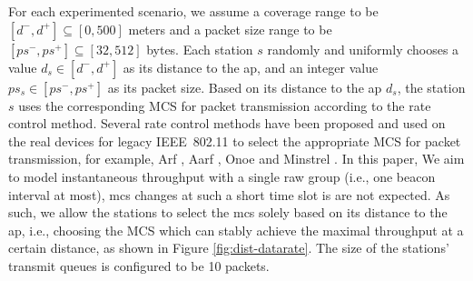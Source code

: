 For each experimented scenario, we assume a coverage range to be $[d^-, d^+]  \subseteq [0, 500] $  meters and a packet size range to be $[ps^-, ps^+] \subseteq [32, 512] $ bytes. Each station $s$ randomly and uniformly chooses a value $d_s \in [d^-, d^+]$ as its distance to the \gls{ap}, and an integer value $ps_s \in [ps^-, ps^+]$ as its packet size. Based on its distance to the \gls{ap} $d_s$, the station $s$ uses the corresponding MCS for packet transmission according to the rate control method. Several rate control methods have been proposed and used on the real devices for legacy IEEE~802.11 to select the appropriate MCS for packet transmission, for example, Arf \cite{arf1997},  Aarf \cite{aarf2004}, Onoe \cite{Onoe} and Minstrel \cite{minstrel2013}. In this paper, We aim to model instantaneous throughput with a single \gls{raw} group (i.e., one beacon interval at most),  \gls{mcs} changes at such a short time slot is are not expected. As such, we allow the stations to select the \gls{mcs} solely based on its distance to the \gls{ap}, i.e., choosing the MCS which can stably achieve the maximal throughput at a certain distance, as shown in Figure \ref{fig:dist-datarate}. The size of the stations' transmit queues is configured to be 10 packets. 











